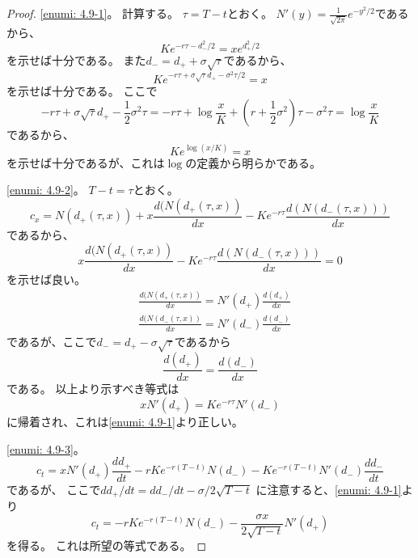 \documentclass[uplatex]{jsarticle}
\theoremstyle{definition}
\begin{document}
\begin{proof}
  \ref{enumi: 4.9-1}。
  計算する。
  \(\tau = T-t\)とおく。
  \(N'(y) = \frac{1}{\sqrt{2\pi}}e^{-y^2/2}\)であるから、
  \[
  Ke^{-r\tau-d_-^2/2} = xe^{d_+^2/2}
  \]
  を示せば十分である。
  また\(d_- = d_+ + \sigma\sqrt{\tau}\)であるから、
  \[
  Ke^{-r\tau + \sigma\sqrt{\tau}d_+ - \sigma^2\tau/2} = x
  \]
  を示せば十分である。
  ここで
  \[
  -r\tau + \sigma\sqrt{\tau}d_+ - \frac{1}{2}\sigma^2\tau
  = -r\tau +
  \log \frac{x}{K} + \left( r + \frac{1}{2}\sigma^2\right) \tau
  - \sigma^2\tau
  = \log \frac{x}{K}\]
  であるから、
  \[
  Ke^{\log(x/K)} = x
  \]
  を示せば十分であるが、これは\(\log\)の定義から明らかである。

  \ref{enumi: 4.9-2}。
  \(T-t=\tau\)とおく。
  \[
  c_x = N(d_+(\tau,x)) + x\frac{d(N(d_+(\tau,x))}{dx}
  -Ke^{-r\tau}\frac{d(N(d_-(\tau,x)))}{dx}
  \]
  であるから、
  \[
  x\frac{d(N(d_+(\tau,x))}{dx}
  -Ke^{-r\tau}\frac{d(N(d_-(\tau,x)))}{dx} = 0
  \]
  を示せば良い。
  \begin{align*}
    &\frac{d(N(d_+(\tau,x))}{dx} = N'(d_+)\frac{d(d_+)}{dx} \\
    &\frac{d(N(d_-(\tau,x))}{dx} = N'(d_-)\frac{d(d_-)}{dx}
  \end{align*}
  であるが、ここで\(d_- = d_+ - \sigma\sqrt{\tau}\)であるから
  \[
  \frac{d(d_+)}{dx} = \frac{d(d_-)}{dx}
  \]
  である。
  以上より示すべき等式は
  \[
  xN'(d_+) = Ke^{-r\tau}N'(d_-)
  \]
  に帰着され、これは\ref{enumi: 4.9-1}より正しい。

  \ref{enumi: 4.9-3}。
  \[
  c_t = xN'(d_+)\frac{dd_+}{dt} -
  rKe^{-r(T-t)}N(d_-) - Ke^{-r(T-t)}N'(d_-)\frac{dd_-}{dt}
  \]
  であるが、
  ここで\(dd_+/dt = dd_-/dt - \sigma/2\sqrt{T-t}\)
  に注意すると、\ref{enumi: 4.9-1}より
  \[
  c_t = - rKe^{-r(T-t)}N(d_-) - \frac{\sigma x}{2\sqrt{T-t}}N'(d_+)
  \]
  を得る。
  これは所望の等式である。


\end{proof}
\end{document}
